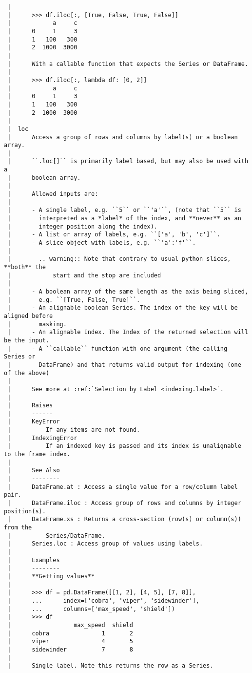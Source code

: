 \documentclass[
  letterpaper,
  DIV=11,
  numbers=noendperiod]{scrreprt}
\begin{document}
\begin{verbatim}
 |      
 |      >>> df.iloc[:, [True, False, True, False]]
 |            a     c
 |      0     1     3
 |      1   100   300
 |      2  1000  3000
 |      
 |      With a callable function that expects the Series or DataFrame.
 |      
 |      >>> df.iloc[:, lambda df: [0, 2]]
 |            a     c
 |      0     1     3
 |      1   100   300
 |      2  1000  3000
 |  
 |  loc
 |      Access a group of rows and columns by label(s) or a boolean array.
 |      
 |      ``.loc[]`` is primarily label based, but may also be used with a
 |      boolean array.
 |      
 |      Allowed inputs are:
 |      
 |      - A single label, e.g. ``5`` or ``'a'``, (note that ``5`` is
 |        interpreted as a *label* of the index, and **never** as an
 |        integer position along the index).
 |      - A list or array of labels, e.g. ``['a', 'b', 'c']``.
 |      - A slice object with labels, e.g. ``'a':'f'``.
 |      
 |        .. warning:: Note that contrary to usual python slices, **both** the
 |            start and the stop are included
 |      
 |      - A boolean array of the same length as the axis being sliced,
 |        e.g. ``[True, False, True]``.
 |      - An alignable boolean Series. The index of the key will be aligned before
 |        masking.
 |      - An alignable Index. The Index of the returned selection will be the input.
 |      - A ``callable`` function with one argument (the calling Series or
 |        DataFrame) and that returns valid output for indexing (one of the above)
 |      
 |      See more at :ref:`Selection by Label <indexing.label>`.
 |      
 |      Raises
 |      ------
 |      KeyError
 |          If any items are not found.
 |      IndexingError
 |          If an indexed key is passed and its index is unalignable to the frame index.
 |      
 |      See Also
 |      --------
 |      DataFrame.at : Access a single value for a row/column label pair.
 |      DataFrame.iloc : Access group of rows and columns by integer position(s).
 |      DataFrame.xs : Returns a cross-section (row(s) or column(s)) from the
 |          Series/DataFrame.
 |      Series.loc : Access group of values using labels.
 |      
 |      Examples
 |      --------
 |      **Getting values**
 |      
 |      >>> df = pd.DataFrame([[1, 2], [4, 5], [7, 8]],
 |      ...      index=['cobra', 'viper', 'sidewinder'],
 |      ...      columns=['max_speed', 'shield'])
 |      >>> df
 |                  max_speed  shield
 |      cobra               1       2
 |      viper               4       5
 |      sidewinder          7       8
 |      
 |      Single label. Note this returns the row as a Series.

\end{verbatim}
\end{document}
